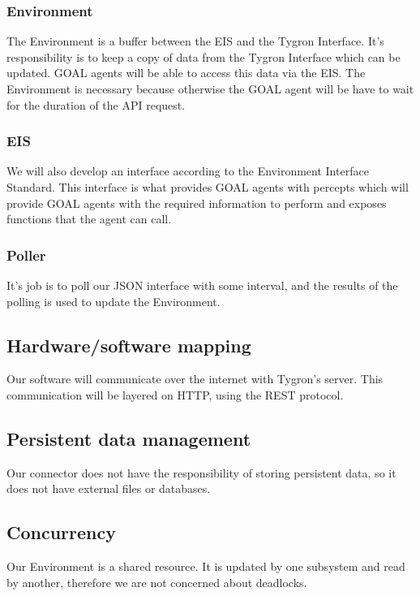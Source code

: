 \documentclass[a4paper]{article}
\begin{document}
\subsubsection{Environment}
The Environment is a buffer between the EIS and the Tygron Interface. It’s responsibility is to keep a copy of data from the Tygron Interface which can be updated. GOAL agents will be able to access this data via the EIS. The Environment is necessary because otherwise the GOAL agent will be have to wait for the duration of the API request.

\subsubsection{EIS}
We will also develop an interface according to the Environment Interface Standard. This interface is what provides GOAL agents with percepts which will provide GOAL agents with the required information to perform and exposes functions that the agent can call.

\subsubsection{Poller}
It’s job is to poll our JSON interface with some interval, and the results of the polling is used to update the Environment. 

\subsection{Hardware/software mapping}
Our software will communicate over the internet with Tygron’s server. This communication will be layered on HTTP, using the REST protocol.

\subsection{Persistent data management}
Our connector does not have the responsibility of storing persistent data, so it does not have external files or databases.

\subsection{Concurrency}
Our Environment is a shared resource. It is updated by one subsystem and read by another, therefore we are not concerned about deadlocks.

\clearpage
\end{document}
